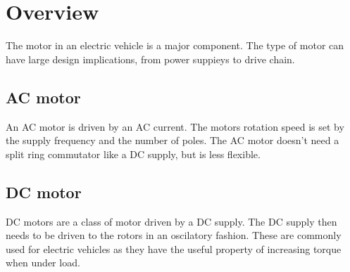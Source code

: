 \documentclass{article}
\begin{document}
\section{Overview}
The motor in an electric vehicle is a major component.
The type of motor can have large design implications, from power suppieys to drive chain.
\subsection{AC motor}
An AC motor is driven by an AC current.
The motors rotation speed is set by the supply frequency and the number of poles.
The AC motor doesn't need a split ring commutator like a DC supply, but is less flexible.
\subsection{DC motor}
DC motors are a class of motor driven by a DC supply.
The DC supply then needs to be driven to the rotors in an oscilatory fashion. 
These are commonly used for electric vehicles as they have the useful property of increasing torque when under load. 
\end{document}
